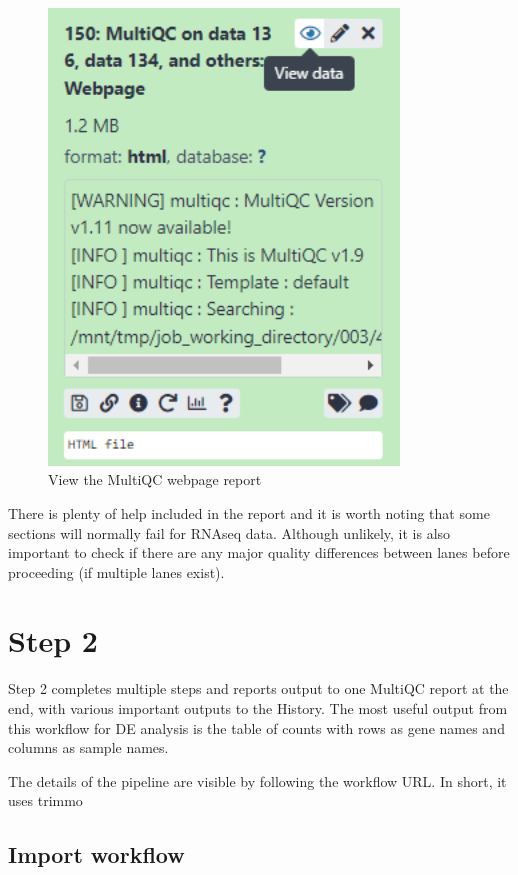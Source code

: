 \documentclass[
]{book}
\begin{document}
\begin{figure}

{\centering \includegraphics[width=3.67in]{images/image_view_multiQC} 

}

\caption{View the MultiQC webpage report}\label{fig:view-multiQC}
\end{figure}

There is plenty of help included in the report and it is worth noting that some sections will normally fail for RNAseq data. Although unlikely, it is also important to check if there are any major quality differences between lanes before proceeding (if multiple lanes exist).

\hypertarget{step-2}{%
\chapter{Step 2}\label{step-2}}

Step 2 completes multiple steps and reports output to one MultiQC report at the end, with various important outputs to the History.
The most useful output from this workflow for DE analysis is the table of counts with rows as gene names and columns as sample names.

The details of the pipeline are visible by following the workflow URL. In short, it uses trimmo

\hypertarget{import-workflow}{%
\section{Import workflow}\label{import-workflow}}
\end{document}
